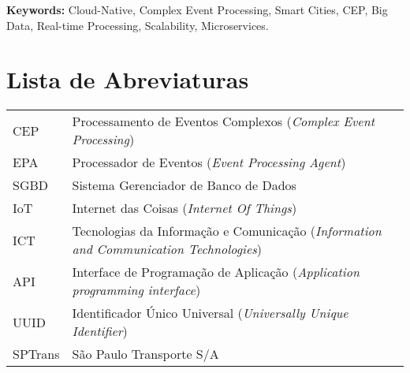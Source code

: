 \documentclass[11pt,twoside,a4paper]{book}
\begin{document}

\noindent \textbf{Keywords:} Cloud-Native, Complex Event Processing, Smart Cities, CEP, Big Data, Real-time Processing, Scalability, Microservices.

\tableofcontents    %

\chapter{Lista de Abreviaturas}
\begin{tabular}{ll}
         CEP         & Processamento de Eventos Complexos (\emph{Complex Event Processing})\\
         EPA         & Processador de Eventos (\emph{Event Processing Agent})\\
         SGBD        & Sistema Gerenciador de Banco de Dados \\
         IoT         & Internet das Coisas (\emph{Internet Of Things})\\
         ICT         & Tecnologias da Informação e Comunicação (\emph{Information and Communication Technologies})\\
         API		 & Interface de Programação de Aplicação (\emph{Application programming interface}) \\
         UUID        & Identificador Único Universal (\emph{Universally Unique Identifier}) \\
         SPTrans   & São Paulo Transporte S/A 
\end{tabular}


\listoffigures            
\listoftables            
\end{document}
